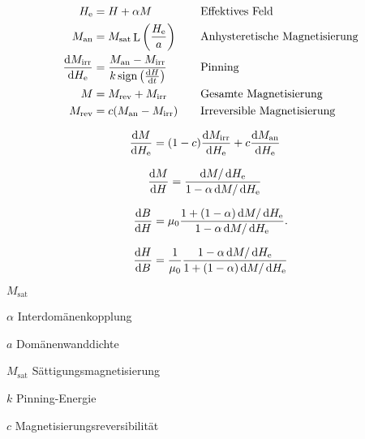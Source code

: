 \documentclass{scrartcl}
\DeclareMathOperator{\sign}{sign}
\DeclareMathOperator{\Langevin}{L}
\newcommand{\He}{H_\text{e}}
\newcommand{\Man}{M_\text{an}}
\newcommand{\Msat}{M_\text{sat}}
\newcommand{\Mirr}{M_\text{irr}}
\newcommand{\Mrev}{M_\text{rev}}
\begin{document}
 
\color{gray}
\begin{align}
	\He &= H + \alpha M \quad &&\text{Effektives Feld} \label{eq:h_eff}\\
	\Man &= \Msat \Langevin\left(\frac{\He}{a}\right) \quad &&\text{Anhysteretische Magnetisierung}  \label{eq:m_an}\\
	\frac{\dif\Mirr}{\dif \He} &= \frac{\Man - \Mirr}{k \sign\left(\frac{\dif H}{\dif t}\right)} \quad &&\text{Pinning} \label{eq:pinning}\\
	M &= \Mrev + \Mirr \quad &&\text{Gesamte Magnetisierung} \label{eq:m_gesamt}\\
	\Mrev &= c(\Man - \Mirr) \quad &&\text{Irreversible Magnetisierung} \label{eq:m_rev}
\end{align}


\begin{align}
	\frac{\dif M}{\dif \He} &= (1-c) \frac{\dif \Mirr}{\dif \He} + c \frac{\dif \Man}{\dif \He} \label{eq:dm_dhe}
\end{align}

\begin{equation*}
	\begin{aligned}
		\frac{\dif M}{\dif H} &= \frac{\dif M/\dif \He}{1 - \alpha \dif M/\dif \He}
	\end{aligned}
\end{equation*}

\begin{equation*}
\begin{aligned}
	\frac{\dif B}{\dif H} = \mu_0 \frac{1 + (1-\alpha)\dif M/\dif \He}{1 - \alpha \dif M/\dif \He}. \label{eq:dB_dH}
\end{aligned}
\end{equation*}

\begin{equation*}
	\frac{\dif H}{\dif B} = \frac{1}{\mu_0} \frac{1 - \alpha \dif M/\dif \He}{1 + (1-\alpha)\dif M/\dif \He}
\end{equation*}

\begin{labeling}{$\Msat$}
	\item[$\alpha$]{Interdomänenkopplung}
	\item[$a$]{Domänenwanddichte}
	\item[$\Msat$]{Sättigungsmagnetisierung}
	\item[$k$]{Pinning-Energie}
	\item[$c$]{Magnetisierungsreversibilität}
\end{labeling}
\end{document}
